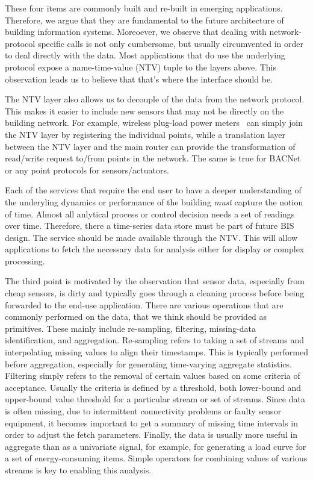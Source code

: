 These four items are commonly built and re-built in emerging applications.  Therefore, we argue that they are fundamental 
to the future architecture of building information systems.  Moreoever, we observe that dealing with network-protocol specific
calls is not only cumbersome, but usually circumvented in order to deal directly with the data.  Most applications that do
use the underlying protocol expose a name-time-value (NTV) tuple to the layers above.  This observation leads us to believe that
that's where the interface should be.

The NTV layer also allows us to decouple of the data from the network protocol.  This makes it easier to include 
new sensors that may not be directly on the building network.  For example, wireless plug-load power meters~\cite{ACme}
can simply join the NTV layer by registering the individual points, while a translation layer between the NTV layer and the
main router can provide the transformation of read/write request to/from points in the network.  The same is true for BACNet
or any point protocols for sensors/actuators.

Each of the services that require the end user to have a deeper understanding of the underyling dynamics or performance
of the building \emph{must} capture the notion of time.  Almost all anlytical process or control decision needs a set of readings
over time.  Therefore, there a time-series data store must be part of future BIS design.  The service should be made available
through the NTV.  This will allow applications to fetch the necessary data for analysis either for display or complex processing.

The third point is motivated by the observation that sensor data, especially from cheap sensors, is dirty and typically goes
through a cleaning process before being forwarded to the end-use application.  There are various operations that are commonly
performed on the data, that we think should be provided as primitives.  These mainly include re-sampling, filtering,  
missing-data identification, and aggregation.  Re-sampling refers to taking a set of streams and interpolating missing values to 
align their timestamps.  This is typically performed before aggregation, especially for generating time-varying aggregate statistics.
Filtering simply refers to the removal of certain values based on some criteria of acceptance.  Usually the criteria is defined
by a threshold, both lower-bound and upper-bound value threshold for a particular stream or set of streams.
Since data is often missing, due to intermittent connectivity problems or faulty sensor equipment, it becomes important to 
get a summary of missing time intervals in order to adjust the fetch parameters.  Finally, the data is usually more
useful in aggregate than as a univariate signal, for example, for generating a load curve for a set of energy-consuming items.
Simple operators for combining values of various streams is key to enabling this analysis.

